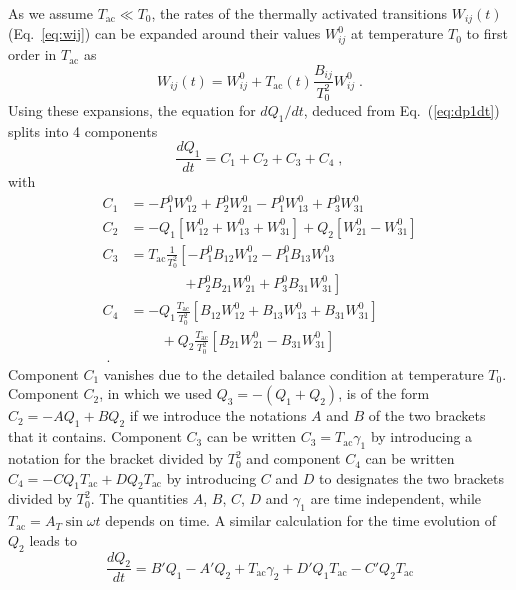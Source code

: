 \documentclass[pre,a4paper,twocolumn,superscriptaddress,%
floatfix]{revtex4}
\newcommand{\tac}{\ensuremath{T_{\mathrm{ac}}}}
\newcommand{\dtac}{\ensuremath{A_T}}
\begin{document}
\smallskip
As we assume $\tac \ll T_0$, the rates of the thermally activated
transitions $W_{ij}(t)$ (Eq.~\ref{eq:wij}) can be
expanded around their values $W_{ij}^0$ at temperature $T_0$  to
first order in $\tac$ as
\begin{equation}
  \label{eq:expanw}
  W_{ij}(t) = W_{ij}^0 + \tac(t) \frac{B_{ij}}{T_0^2} W_{ij}^0 \; .
\end{equation}
Using these expansions, the equation for $dQ_1/dt$, deduced from
Eq.~(\ref{eq:dp1dt}) splits into 4 components
\begin{equation}
  \label{eq:dq1components}
  \frac{dQ_1}{dt} = C_1 + C_2 + C_3 + C_4 \;,
\end{equation}
with
\begin{align}
  \label{eq:defci}
  C_1 &= - P_1^0 W_{12}^0 + P_2^0 W_{21}^0 - P_1^0 W_{13}^0 + P_3^0 W_{31}^0
        \nonumber \\
  C_2 &= -Q_1 \left[ W_{12}^0 + W_{13}^0 + W_{31}^0 \right]
        + Q_2 \left[ W_{21}^0 - W_{31}^0 \right]
        \nonumber \\
  C_3 &= \tac \frac{1}{T_0^2} \left[ -P_1^0 B_{12} W_{12}^0 - P_1^0 B_{13}
        W_{13}^0 \right. \nonumber \\
      &\qquad \qquad\left. + P_2^0 B_{21} W_{21}^0  + P_3^0 B_{31} W_{31}^0
        \right]  \nonumber \\
  C_4 &= - Q_1 \frac{\tac}{T_0^2} \left[ B_{12} W_{12}^0 + B_{13} W_{13}^0
        + B_{31} W_{31}^0 \right] \nonumber \\
      &~ \qquad + Q_2 \frac{\tac}{T_0^2} \left[ B_{21} W_{21}^0 - B_{31} W_{31}^0
        \right] \nonumber \\ \; .
\end{align}
Component $C_1$ vanishes due to the detailed balance condition at temperature
$T_0$. Component $C_2$, in which
we used $Q_3 = - (Q_1 + Q_2)$,
is of the form $C_2 = -A Q_1 + B Q_2$ if we introduce
the notations $A$ and $B$ of the two brackets that it contains. Component
$C_3$ can be written $C_3 = \tac \gamma_1$ by introducing a notation for the
bracket divided by $T_0^2$ and component $C_4$ can be written
$C_4 = - C Q_1 \tac + D Q_2 \tac$ by introducing $C$ and $D$ to designates the
two brackets divided by $T_0^2$. The quantities $A$, $B$, $C$, $D$ and
$\gamma_1$ are time independent, while $\tac = \dtac \sin \omega t$
depends on time. A similar calculation for the time evolution of $Q_2$ leads
to
\begin{equation}
  \label{eq:q2}
  \frac{dQ_2}{dt} = B' Q_1 - A' Q_2 + \tac \gamma_2 + D' Q_1 \tac - C' Q_2
  \tac
\end{equation}
\end{document}
